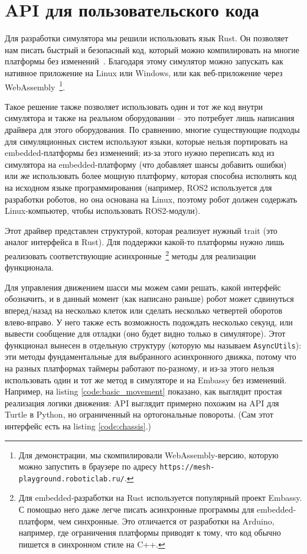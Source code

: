\documentclass[%
]{report}
\begin{document}
\section{API для пользовательского кода}

Для разработки симулятора мы решили использовать язык Rust.
Он позволяет нам писать быстрый и безопасный код,
который можно компилировать на многие платформы без изменений~\cite{10.1145/2663171.2663188}.
Благодаря этому симулятор можно запускать как нативное приложение на Linux или Windows,
или как веб-приложение через WebAssembly~\footnote{Для демонстрации,
мы скомпилировали WebAssembly-версию, которую можно запустить в браузере по адресу \texttt{https://mesh-playground.roboticlab.ru/}.}.

Такое решение также позволяет использовать один и тот же код внутри симулятора
и также на реальном оборудовании --
это потребует лишь написания драйвера для этого оборудования.
По сравнению, многие существующие подходы
для симуляционных систем
используют языки,
которые нельзя портировать на embedded-платформы без изменений;
из-за этого нужно переписать код из симулятора на embedded-платформу
(что добавляет шансы добавить ошибки)
или же использовать более мощную платформу, которая способна
исполнять код на исходном языке программирования
(например, ROS2 используется для разработки роботов,
но она основана на Linux, поэтому робот должен содержать
Linux-компьютер, чтобы использовать ROS2-модули).

Этот драйвер представлен структурой, которая реализует нужный trait (это аналог интерфейса в Rust).
Для поддержки какой-то платформы нужно лишь реализовать соответствующие асинхронные~\footnote{Для embedded-разработки
на Rust используется популярный проект Embassy. С помощью него даже легче писать асинхронные программы
для embedded-платформ, чем синхронные. Это отличается от разработки на Arduino, например,
где ограничения платформы приводят к тому,
что код обычно пишется в синхронном стиле на C++.}
 методы для реализации функционала.

Для управления движением шасси мы можем сами решать, какой интерфейс обозначить,
и в данный момент (как написано раньше)
робот может сдвинуться вперед/назад на несколько клеток или сделать несколько четвертей оборотов
влево-вправо.
У него также есть возможность подождать несколько секунд,
или вывести сообщение для отладки
(оно будет видно только в симуляторе).
Этот функционал вынесен в отдельную структуру
(которую мы называем \texttt{AsyncUtils}):
эти методы фундаментальные для выбранного асинхронного движка,
потому что на разных платформах таймеры работают по-разному,
и из-за этого нельзя использовать один и тот же метод 
в симуляторе и на Embassy без изменений.
Например, на listing \ref{code:basic_movement} показано,
как выглядит простая реализация логики движения:
API выглядит примерно похожим на API для Turtle в Python,
но ограниченный на ортогональные повороты.
(Сам этот интерфейс есть на listing \ref{code:chassis}.)
\end{document}
